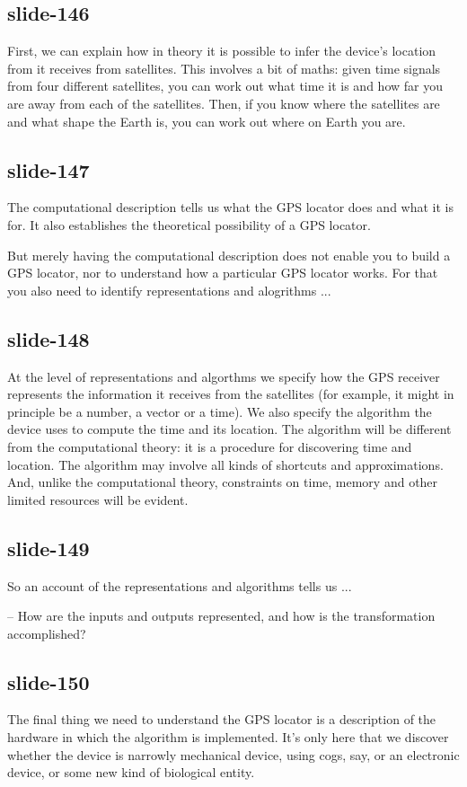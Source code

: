 \documentclass[12pt,\papersize]{extarticle}
\begin{document}
\subsection{slide-146}
First, we can explain how in theory it is possible to infer the
device’s location from it receives from satellites.
This involves a bit of maths: given time signals from four different satellites,
you can work out what time it is and how far you are away from each
of the satellites.
Then, if you know where the satellites are and what shape the Earth is,
you can work out where on Earth you are.

\subsection{slide-147}
The computational description tells us what the GPS locator does and
what it is for.
It also establishes the theoretical possibility of a GPS locator.

But merely having the computational description does not enable you to build
a GPS locator, nor to understand how a particular GPS locator works.
For that you also need to identify representations and alogrithms ...

\subsection{slide-148}
At the level of representations and algorthms we specify
how the GPS receiver represents the information it receives from the satellites
(for example, it might in principle be a number, a vector or a time).
We also specify the algorithm the device uses to compute the time and its location.
The algorithm will be different from the computational theory: it is a procedure
for discovering time and location.
The algorithm may involve all kinds of shortcuts and approximations.
And, unlike the computational theory, constraints on time, memory and other
limited resources will be evident.

\subsection{slide-149}
So an account of the representations and algorithms tells us ...

-- How are the inputs and outputs represented, and how is the transformation accomplished?

\subsection{slide-150}
The final thing we need to understand the GPS locator is a description of the
hardware in which the algorithm is implemented.  It’s only here that
we discover whether the device is narrowly mechanical device, using cogs, say,
or an electronic device, or some new kind of biological entity.
\end{document}
